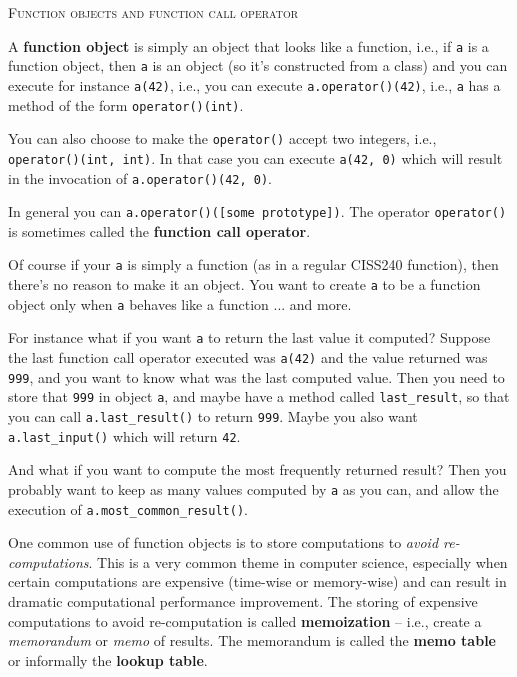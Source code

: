 \textsc{Function objects and function call operator}

A \textbf{function object} is simply an object that looks like a function, i.e.,
if \verb!a! is a function object, then \verb!a! is an object
(so it's constructed from a class) and you can execute for instance
\verb!a(42)!, i.e.,
you can execute \verb!a.operator()(42)!, i.e., \verb!a! has a method
of the form \verb!operator()(int)!.

You can also choose to make the \verb!operator()! accept two integers, i.e.,
\verb!operator()(int, int)!.
In that case you can execute \verb!a(42, 0)! which will result in
the invocation of \verb!a.operator()(42, 0)!.

In general you can 
\texttt{a.operator()(\textnormal[some prototype])}.
The operator \verb!operator()! is sometimes called the
\textbf{function call operator}.

Of course if your \verb!a! is simply a function (as in a regular
CISS240 function),
then there's no reason to make it an object.
You want to create \verb!a! to be a function object only when \verb!a!
behaves like a function ... and more.

For instance what if you want \verb!a! to return the last value it computed?
Suppose the last function call operator executed was \verb!a(42)! and the
value returned was \verb!999!, and you want to know what was the last computed
value. Then you need to store that \verb!999! in object \verb!a!,
and maybe have a method called \verb!last_result!, so that
you can call \verb!a.last_result()! to return \verb!999!.
Maybe you also want \verb!a.last_input()! which will return \verb!42!.

And what if you want to compute the most frequently returned result?
Then you probably want to keep as many values computed by \verb!a!
as you can, and allow the execution of \verb!a.most_common_result()!.

One common use of function objects is to store computations
to \textit{avoid re-computations}.
This is a very common theme in computer science, especially
when certain computations are expensive (time-wise or memory-wise)
and can result in dramatic computational performance improvement.
The storing of expensive computations to avoid re-computation
is called \textbf{memoization} -- i.e., create a 
\textit{memorandum} or \textit{memo} of
results.
The memorandum is called the \textbf{memo table}
or informally the \textbf{lookup table}.
